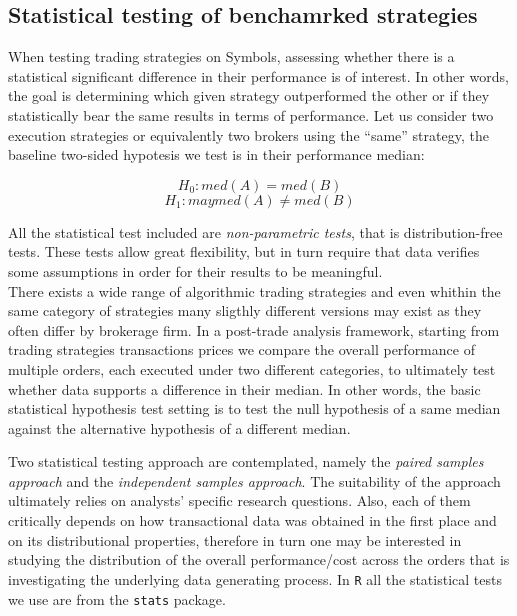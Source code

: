 \hypertarget{statistical-testing-of-benchamrked-strategies}{%
\subsection{Statistical testing of benchamrked
strategies}\label{statistical-testing-of-benchamrked-strategies}}

When testing trading strategies on Symbols, assessing whether there is a
statistical significant difference in their performance is of interest.
In other words, the goal is determining which given strategy
outperformed the other or if they statistically bear the same results in
terms of performance. Let us consider two execution strategies or
equivalently two brokers using the ``same'' strategy, the baseline
two-sided hypotesis we test is in their performance median:

\[ H_{0}: med(A) = med(B) \] \[ H_{1}:may med(A) \neq med(B) \]

All the statistical test included are \emph{non-parametric tests}, that
is distribution-free tests. These tests allow great flexibility, but in
turn require that data verifies some assumptions in order for their
results to be meaningful.\\
There exists a wide range of algorithmic trading strategies and even
whithin the same category of strategies many sligthly different versions
may exist as they often differ by brokerage firm. In a post-trade
analysis framework, starting from trading strategies transactions prices
we compare the overall performance of multiple orders, each executed
under two different categories, to ultimately test whether data supports
a difference in their median. In other words, the basic statistical
hypothesis test setting is to test the null hypothesis of a same median
against the alternative hypothesis of a different median.

Two statistical testing approach are contemplated, namely the
\emph{paired samples approach} and the
\emph{independent samples approach}. The suitability of the approach
ultimately relies on analysts' specific research questions. Also, each
of them critically depends on how transactional data was obtained in the
first place and on its distributional properties, therefore in turn one
may be interested in studying the distribution of the overall
performance/cost across the orders that is investigating the underlying
data generating process. In \texttt{R} all the statistical tests we use
are from the \texttt{stats} package.

